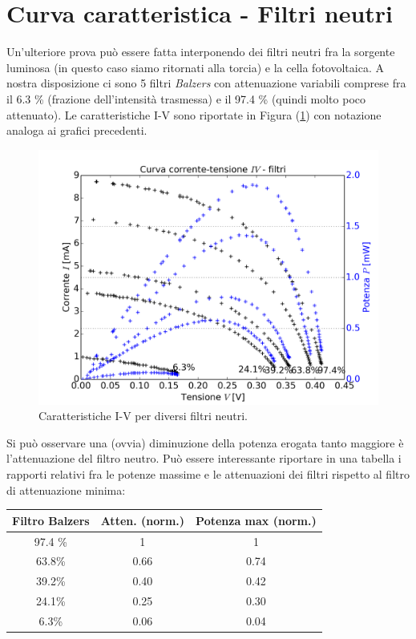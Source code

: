 \documentclass[journal, a4paper]{IEEEtran}
\begin{document}
\section{Curva caratteristica - Filtri neutri}
Un'ulteriore prova può essere fatta interponendo dei filtri neutri fra la sorgente luminosa (in questo caso siamo ritornati alla torcia) e la cella fotovoltaica. A nostra disposizione ci sono 5 filtri \textit{Balzers} con attenuazione variabili comprese fra il 6.3 \% (frazione dell'intensità trasmessa) e il 97.4 \% (quindi molto poco attenuato). Le caratteristiche I-V sono riportate in Figura (\ref{fig:es_8_1}) con notazione analoga ai grafici precedenti.\\

\begin{figure}
\centering
\includegraphics[width=0.9\linewidth]{./es_8_1}
\caption{Caratteristiche I-V per diversi filtri neutri.}
\label{fig:es_8_1}
\end{figure}

Si può osservare una (ovvia) diminuzione della potenza erogata tanto maggiore è l'attenuazione del filtro neutro. Può essere interessante riportare in una tabella i rapporti relativi fra le potenze massime e le attenuazioni dei filtri rispetto al filtro di attenuazione minima:\\

\begin{tabular}{|c|c|c|}
\hline \textbf{Filtro Balzers} & \textbf{Atten.} (norm.) & \textbf{Potenza max} (norm.) \\ 
\hline 97.4 \% & 1 & 1 \\ 
\hline 63.8\% & 0.66 & 0.74 \\ 
\hline 39.2\% & 0.40 & 0.42 \\ 
\hline 24.1\% & 0.25 & 0.30 \\ 
\hline 6.3\% & 0.06 & 0.04 \\ 
\hline 
\end{tabular} 
\end{document}
